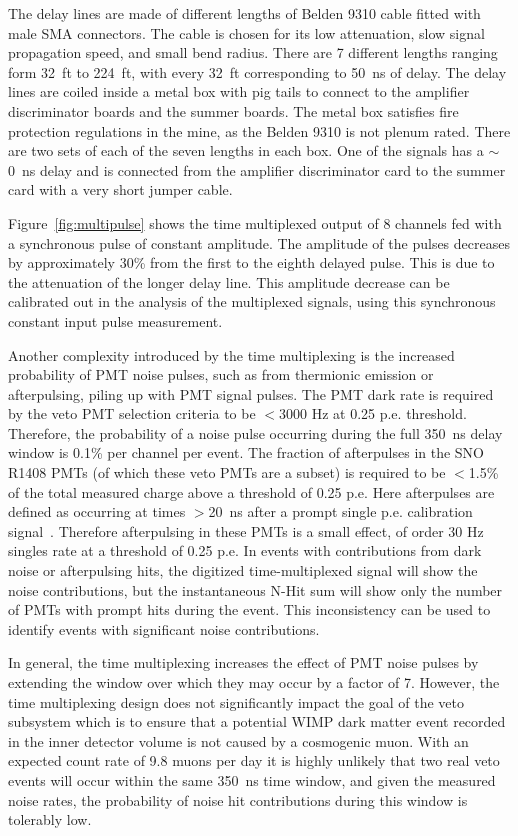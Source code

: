 \documentclass[review,number,sort&compress]{elsarticle}
\begin{document}
The delay lines are made of different lengths of Belden 9310 cable
fitted with male SMA connectors. The cable is chosen for its low
attenuation, slow signal propagation speed, and small bend radius.
There are 7 different lengths ranging form 32~ft to 224~ft, with every
32~ft corresponding to 50~ns of delay. The delay lines are coiled
inside a metal box with pig tails to connect to the amplifier
discriminator boards and the summer boards. The metal box satisfies
fire protection regulations in the mine, as the Belden 9310 is not
plenum rated. There are two sets of each of the seven lengths in each
box.  One of the signals has a $\sim$0~ns delay and is connected from
the amplifier discriminator card to the summer card with a very short
jumper cable.

Figure~\ref{fig:multipulse} shows the time multiplexed output of 8
channels fed with a synchronous pulse of constant amplitude.  The
amplitude of the pulses decreases by approximately 30\% from the first
to the eighth delayed pulse.  This is due to the attenuation of the
longer delay line.  This amplitude decrease can be calibrated out in
the analysis of the multiplexed signals, using this synchronous
constant input pulse measurement.

Another complexity introduced by the time multiplexing is the
increased probability of PMT noise pulses, such as from thermionic
emission or afterpulsing, piling up with PMT signal pulses.  The PMT
dark rate is required by the veto PMT selection criteria to be $<$3000
Hz at 0.25 p.e. threshold.  Therefore, the probability of a noise
pulse occurring during the full 350~ns delay window is 0.1\% per
channel per event.  The fraction of afterpulses in the SNO R1408 PMTs
(of which these veto PMTs are a subset) is required to be $<$1.5\% of
the total measured charge above a threshold of 0.25 p.e.  Here
afterpulses are defined as occurring at times $>$20~ns after a prompt
single p.e. calibration signal~\cite{ref:sno_pmt_paper}.  Therefore
afterpulsing in these PMTs is a small effect, of order 30 Hz singles
rate at a threshold of 0.25 p.e.  In events with contributions from
dark noise or afterpulsing hits, the digitized time-multiplexed signal
will show the noise contributions, but the instantaneous N-Hit sum
will show only the number of PMTs with prompt hits during the event.
This inconsistency can be used to identify events with significant
noise contributions.

In general, the time multiplexing increases the effect of PMT noise
pulses by extending the window over which they may occur by a factor
of 7. However, the time multiplexing design does not significantly
impact the goal of the veto subsystem which is to ensure that a
potential WIMP dark matter event recorded in the inner detector volume
is not caused by a cosmogenic muon. With an expected count rate of
9.8 muons per day it is highly unlikely that two real veto events will
occur within the same 350~ns time window, and given the measured noise
rates, the probability of noise hit contributions during this window
is tolerably low.
\end{document}
